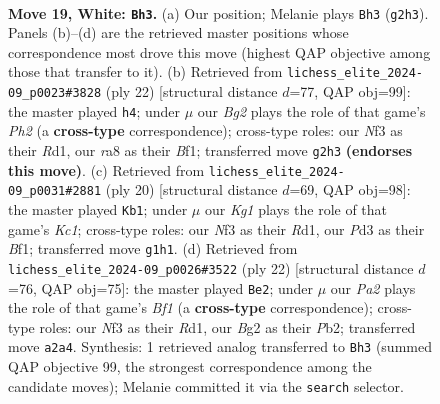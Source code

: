 \documentclass[11pt]{article}
\begin{document}
\clearpage

\begin{figure}[p]\centering
\begin{subfigure}{0.46\textwidth}\centering
\resizebox{\linewidth}{!}{%
\newchessgame
\chessboard[
  setfen={r1bq1r1k/1p1pppbp/p2n4/3Q4/2P5/2NP1N2/PP3PBP/R1B2RK1 w - - 1 19},
  showmover=false,
  pgfstyle=straightmove, color=movearrow, markmove={g2-h3}
]}
\caption{}
\end{subfigure}\hfill
\begin{subfigure}{0.46\textwidth}\centering
\resizebox{\linewidth}{!}{%
\newchessgame
\chessboard[
  setfen={r3k2r/1pqbbppp/p2ppn2/6B1/3QP3/2N2P2/PPP3PP/1K1R1B1R w kq - 1 12},
  showmover=false,
  pgfstyle=straightmove, color=movearrow, markmove={h2-h4}
]}
\caption{}
\end{subfigure}
\\[4pt]
\begin{subfigure}{0.46\textwidth}\centering
\resizebox{\linewidth}{!}{%
\newchessgame
\chessboard[
  setfen={r2q1rk1/pp1bbppp/3ppn2/6B1/3QP2P/2N5/PPP2PP1/2KR1B1R w - - 1 11},
  showmover=false,
  pgfstyle=straightmove, color=movearrow, markmove={c1-b1}
]}
\caption{}
\end{subfigure}\hfill
\begin{subfigure}{0.46\textwidth}\centering
\resizebox{\linewidth}{!}{%
\newchessgame
\chessboard[
  setfen={r3kb1r/1pqb1pp1/p2ppn2/7p/3QP2P/2N1BP2/PPP3P1/2KR1B1R w kq - 1 12},
  showmover=false,
  pgfstyle=straightmove, color=movearrow, markmove={f1-e2}
]}
\caption{}
\end{subfigure}
\caption{\textbf{Move 19, White: \texttt{Bh3}.} (a) Our position; Melanie plays \texttt{Bh3} (\texttt{g2h3}). Panels (b)--(d) are the retrieved master positions whose correspondence most drove this move (highest QAP objective among those that transfer to it). (b) Retrieved from \texttt{lichess\_elite\_2024-09\_p0023\#3828} (ply 22) [structural distance $d$=77, QAP obj=99]: the master played \texttt{h4}; under $\mu$ our \emph{Bg2} plays the role of that game's \emph{Ph2} (a \textbf{cross-type} correspondence); cross-type roles: our \emph{N}f3 as their \emph{R}d1, our \emph{r}a8 as their \emph{B}f1; transferred move \texttt{g2h3} \textbf{(endorses this move)}. (c) Retrieved from \texttt{lichess\_elite\_2024-09\_p0031\#2881} (ply 20) [structural distance $d$=69, QAP obj=98]: the master played \texttt{Kb1}; under $\mu$ our \emph{Kg1} plays the role of that game's \emph{Kc1}; cross-type roles: our \emph{N}f3 as their \emph{R}d1, our \emph{P}d3 as their \emph{B}f1; transferred move \texttt{g1h1}. (d) Retrieved from \texttt{lichess\_elite\_2024-09\_p0026\#3522} (ply 22) [structural distance $d$=76, QAP obj=75]: the master played \texttt{Be2}; under $\mu$ our \emph{Pa2} plays the role of that game's \emph{Bf1} (a \textbf{cross-type} correspondence); cross-type roles: our \emph{N}f3 as their \emph{R}d1, our \emph{B}g2 as their \emph{P}b2; transferred move \texttt{a2a4}. Synthesis: 1 retrieved analog transferred to \texttt{Bh3} (summed QAP objective 99, the strongest correspondence among the candidate moves); Melanie committed it via the \texttt{search} selector.}
\label{fig:thought-m36}
\end{figure}
\end{document}
